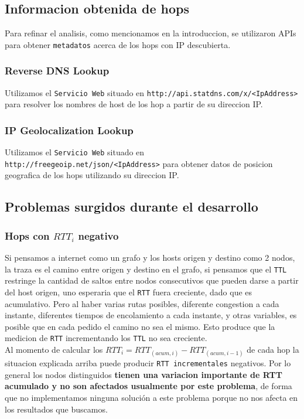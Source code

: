 \subsection{Informacion obtenida de hops}
Para refinar el analisis, como mencionamos en la introduccion, se utilizaron APIs para obtener \texttt{metadatos} acerca de los hops con IP descubierta.

\subsubsection{Reverse DNS Lookup}
Utilizamos el \texttt{Servicio Web} situado en \texttt{http://api.statdns.com/x/<IpAddress>} para resolver los nombres de host de los hop a partir de su direccion IP.

\subsubsection{IP Geolocalization Lookup}
Utilizamos el \texttt{Servicio Web} situado en \texttt{http://freegeoip.net/json/<IpAddress>} para obtener datos de posicion geografica de los hops utilizando su direccion IP.

\subsection{Problemas surgidos durante el desarrollo}
\subsubsection{Hops con $RTT_i$ negativo}
Si pensamos a internet como un grafo y los hosts origen y destino como 2 nodos, la traza es el camino entre origen y destino en el grafo, si pensamos que el \texttt{TTL} restringe la cantidad de saltos entre nodos consecutivos que pueden darse a partir del host origen, uno esperaria que el \texttt{RTT} fuera creciente, dado que es acumulativo. Pero al haber varias rutas posibles, diferente congestion a cada instante, diferentes tiempos de encolamiento a cada instante, y otras variables, es posible que en cada pedido el camino no sea el mismo. Esto produce que la medicion de \texttt{RTT} incrementando los \texttt{TTL} no sea creciente.\\

Al momento de calcular los $RTT_i = RTT_{(acum, i)} - RTT_{(acum, i-1)}$ de cada hop la situacion explicada arriba puede producir \texttt{RTT incrementales} negativos. Por lo general los nodos distinguidos \textbf{tienen una variacion importante de RTT acumulado y no son afectados usualmente por este problema}, de forma que no implementamos ninguna soluci\'on a este problema porque no nos afecta en los resultados que buscamos.

